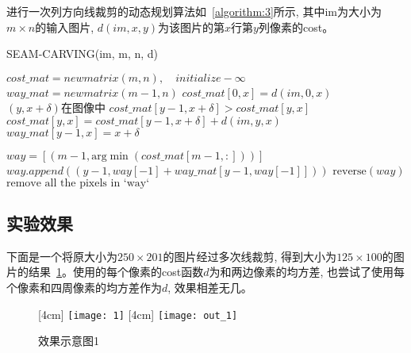 \documentclass[paper=a4, fontsize=11pt]{scrartcl} %
\numberwithin{equation}{section} %
\numberwithin{figure}{section} %
\numberwithin{table}{section} %
\begin{document}
进行一次列方向线裁剪的动态规划算法如~\ref{algorithm:3}所示, 其中$\mbox{im}$为大小为$m \times n$的输入图片, $d(im, x, y)$为该图片的第$x$行第$y$列像素的cost。
\begin{algorithm}[ht]
  \caption{SEAM-CARVING(im, m, n, d)}
  \label{algorithm:3}
  \begin{algorithmic}[1]
    \State $cost\_mat = new matrix(m, n),\quad initialize -\infty$
    \State $way\_mat = new matrix(m - 1, n)$
    \State $cost\_mat[0, x] = d(im, 0, x)$
    \EndFor
    \If $(y, x + \delta)在图像中$
    \If $cost\_mat[y-1, x+\delta] > cost\_mat[y,x]$
    \State $cost\_mat[y,x] = cost\_mat[y-1, x+\delta] + d(im, y, x)$
    \State $way\_mat[y-1, x] = x + \delta$
    \EndIf
    \EndIf
    \EndFor
    \EndFor
    \EndFor

    \State $way=[(m-1, \mbox{arg}\min(cost\_mat[m-1, :]))]$
    \State $way.append((y-1, way[-1] + way\_mat[y-1, way[-1]]))$
    \EndFor
    \State $\mbox{reverse}(way)$
    \State $\mbox{remove all the pixels in `way`}$
  \end{algorithmic}
\end{algorithm}

\subsection{实验效果}
下面是一个将原大小为$250 \times 201$的图片经过多次线裁剪, 得到大小为$125 \times 100$的图片的结果~\ref{pic:1}。使用的每个像素的cost函数$d$为和两边像素的均方差, 也尝试了使用每个像素和四周像素的均方差作为$d$, 效果相差无几。
\begin{figure}
  \centering%
  \subcaptionbox{}[4cm]
                {\texttt{[image: 1]}}
                \subcaptionbox{}[4cm]
                              {\texttt{[image: out\_1]}}
                              \caption{效果示意图1}
                              \label{pic:1}
\end{figure}
\end{document}
